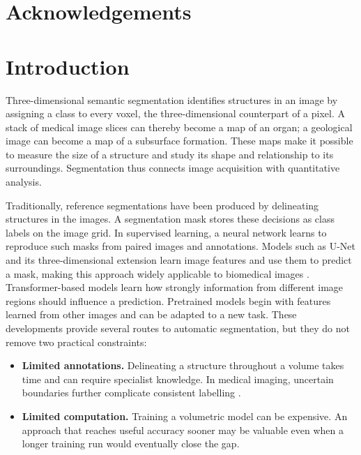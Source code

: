 \documentclass[12pt,a4paper]{article}
\begin{document}
\pagestyle{empty}
\hypersetup{pageanchor=false}
\null
\newpage
\null
\newpage

\section*{Acknowledgements}

\clearpage
\null
\newpage

\pagestyle{plain}
\setcounter{page}{1}
\hypersetup{pageanchor=true}
\setcounter{tocdepth}{2}
\tableofcontents
\clearpage
\section{Introduction}\label{sec:introduction}
\label{sec:motivation}\label{sec:research-questions}

Three-dimensional semantic segmentation identifies structures in an image
by assigning a class to every voxel, the three-dimensional counterpart
of a pixel. A stack of medical image slices can thereby become a map of
an organ; a geological image can become a map of a subsurface formation.
These maps make it possible to measure the size of a structure and study
its shape and relationship to its surroundings. Segmentation thus connects
image acquisition with quantitative analysis.

Traditionally, reference segmentations have been produced by delineating
structures in the images. A segmentation mask stores these decisions as
class labels on the image grid. In supervised learning, a neural network
learns to reproduce such masks from paired images and annotations.
Models such as U-Net and its three-dimensional extension learn image
features and use them to predict a mask, making this approach widely
applicable to biomedical images \cite{ronneberger2015unet,cicek2016unet}.
Transformer-based models learn how strongly information from different
image regions should influence a prediction. Pretrained models begin
with features learned from other images and can be adapted to a new task. These developments provide several routes to automatic
segmentation, but they do not remove two practical constraints:
\begin{itemize}
\item \textbf{Limited annotations.} Delineating a structure throughout a
volume takes time and can require specialist knowledge. In medical
imaging, uncertain boundaries further complicate consistent labelling
\cite{wang2021annotation}.
\item \textbf{Limited computation.} Training a volumetric model can be
expensive. An approach that reaches useful accuracy sooner may be
valuable even when a longer training run would eventually close the gap.
\end{itemize}
\end{document}
